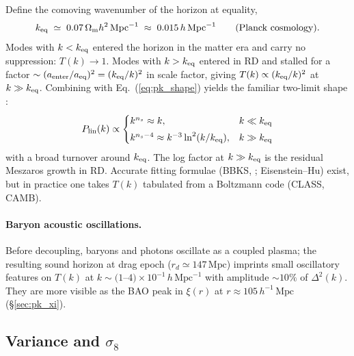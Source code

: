 \documentclass[12pt]{article}
\newcommand{\Omm}{\Omega_{\rm m}}
\begin{document}
Define the comoving wavenumber of the horizon at equality,
%
\begin{equation}
  k_{\rm eq} \;\simeq\; 0.07\,\Omm h^2\,\mathrm{Mpc}^{-1}
              \;\approx\; 0.015\,h\,\mathrm{Mpc}^{-1}
  \qquad\text{(Planck cosmology)}.
  \label{eq:keq}
\end{equation}
%
Modes with $k<k_{\rm eq}$ entered the horizon in the matter era and
carry no suppression: $T(k)\to1$.  Modes with $k>k_{\rm eq}$ entered
in RD and stalled for a factor $\sim(a_{\rm enter}/a_{\rm eq})^{2}
=(k_{\rm eq}/k)^2$ in scale factor, giving $T(k)\propto(k_{\rm eq}/k)^2$
at $k\gg k_{\rm eq}$.  Combining with
Eq.~(\ref{eq:pk_shape}) yields the familiar two-limit shape
\citep[\S5.1]{Baumann2022}:
%
\begin{equation}
  P_{\rm lin}(k)\propto
  \begin{cases}
    k^{n_s} \approx k,        & k\ll k_{\rm eq}\\[3pt]
    k^{n_s-4}\approx k^{-3}\ln^2(k/k_{\rm eq}), & k\gg k_{\rm eq}
  \end{cases}
  \label{eq:pk_limits}
\end{equation}
%
with a broad turnover around $k_{\rm eq}$.  The log factor at
$k\gg k_{\rm eq}$ is the residual Meszaros growth in RD.
Accurate fitting formulae (BBKS, \citealt{Jeong2010};
Eisenstein--Hu) exist, but in practice one takes $T(k)$ tabulated
from a Boltzmann code (CLASS, CAMB).

\paragraph{Baryon acoustic oscillations.}
Before decoupling, baryons and photons oscillate as a coupled
plasma; the resulting sound horizon at drag epoch
($r_d\simeq 147\,\mathrm{Mpc}$) imprints small oscillatory features
on $T(k)$ at $k\sim(1$--$4)\times10^{-1}\,h\,\mathrm{Mpc}^{-1}$ with
amplitude $\sim 10\%$ of $\Delta^2(k)$.  They are more visible as
the BAO peak in $\xi(r)$ at $r\approx 105\,h^{-1}\,\mathrm{Mpc}$
(\S\ref{sec:pk_xi}).

\subsection{Variance and $\sigma_8$}
\label{sec:sigma8}
\end{document}
